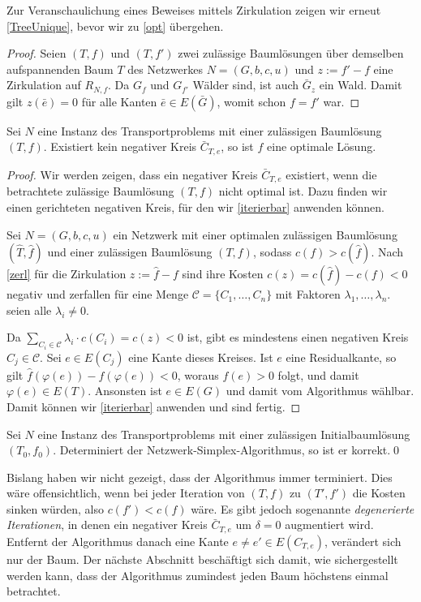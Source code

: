 Zur Veranschaulichung eines Beweises mittels Zirkulation zeigen wir erneut \cref{TreeUnique}, bevor wir zu \cref{opt} übergehen. 

\TreeUnique*
\begin{proof}Seien $(T,f)$ und $(T,f')$ zwei zulässige Baumlösungen über demselben aufspannenden Baum $T$ des Netzwerkes $N=(G,b,c,u)$ und $z:=f'-f$ eine Zirkulation auf $R_{N,f}$. Da $G_f$ und $G_{f'}$ Wälder sind, ist auch $\bar{G}_z$ ein Wald. Damit gilt $z(\bar{e}) = 0$ für alle Kanten $\bar{e}\in E(\bar{G})$, womit schon $f=f'$ war.\end{proof}

\begin{thm}\label{opt}Sei $N$ eine Instanz des Transportproblems mit einer zulässigen Baumlösung $(T,f)$. Existiert kein negativer Kreis $\bar{C}_{T,e}$, so ist $f$ eine optimale Lösung.\end{thm}
\begin{proof}Wir werden zeigen, dass ein negativer Kreis $\bar{C}_{T,e}$ existiert, wenn die betrachtete zulässige Baumlösung $(T,f)$ nicht optimal ist. Dazu finden wir einen gerichteten negativen Kreis, für den wir \cref{iterierbar} anwenden können.
	
Sei $N=(G,b,c,u)$ ein Netzwerk mit einer optimalen zulässigen Baumlösung $(\hat{T},\hat{f})$ und einer zulässigen Baumlösung $(T,f)$, sodass $c(f)>c(\hat{f})$. Nach \cref{zerl} für die Zirkulation $z:=\hat{f}-f$ sind ihre Kosten $c(z)=c(\hat{f})-c(f)<0$ negativ und zerfallen für eine Menge $\mathscr{C}=\{C_1,\ldots,C_n\}$ mit Faktoren $\lambda_1,\ldots,\lambda_n$. \Obda seien alle $\lambda_i\neq 0$.

Da $\sum_{C_i\in\mathscr{C}} \lambda_i\cdot c(C_i)=c(z)<0$ ist, gibt es mindestens einen negativen Kreis $C_j\in\mathscr{C}$. Sei $e\in E(C_j)$ eine Kante dieses Kreises. Ist $e$ eine Residualkante, so gilt $\hat{f}(\varphi(e))-f(\varphi(e))<0$, woraus $f(e)>0$ folgt, und damit $\varphi(e)\in E(T)$. Ansonsten ist $e\in E(G)$ und damit vom Algorithmus wählbar. Damit können wir \cref{iterierbar} anwenden und sind fertig.\end{proof}

\begin{kor}\label{korrekt}Sei $N$ eine Instanz des Transportproblems mit einer zulässigen Initialbaumlösung $(T_0,f_0)$. Determiniert der Netzwerk-Simplex-Algorithmus, so ist er korrekt.\qed\end{kor}

Bislang haben wir nicht gezeigt, dass der Algorithmus immer terminiert. Dies wäre offensichtlich, wenn bei jeder Iteration von $(T,f)$ zu $(T',f')$ die Kosten sinken würden, also $c(f')<c(f)$ wäre. Es gibt jedoch sogenannte \emph{degenerierte Iterationen}, in denen ein negativer Kreis $\bar{C}_{T,e}$ um $\delta=0$ augmentiert wird. Entfernt der Algorithmus danach eine Kante $e\neq e'\in E(C_{T,e})$, verändert sich nur der Baum. Der nächste Abschnitt beschäftigt sich damit, wie sichergestellt werden kann, dass der Algorithmus zumindest jeden Baum höchstens einmal betrachtet.

